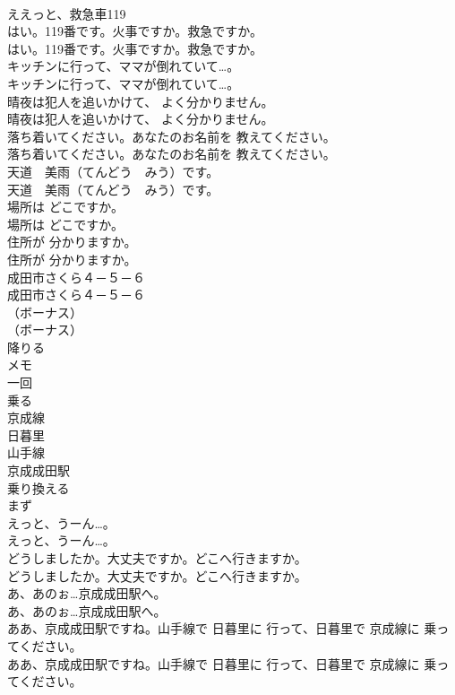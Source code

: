 \documentclass[8pt]{extreport}
\begin{document}
\begin{CJK}{UTF8}{min}
\\	ええっと、救急車119 
\\	はい。119番です。火事ですか。救急ですか。	
\\	はい。119番です。火事ですか。救急ですか。 
\\	キッチンに行って、ママが倒れていて…。	
\\	キッチンに行って、ママが倒れていて…。 
\\	晴夜は犯人を追いかけて、 よく分かりません。	
\\	晴夜は犯人を追いかけて、 よく分かりません。 
\\	落ち着いてください。あなたのお名前を 教えてください。	
\\	落ち着いてください。あなたのお名前を 教えてください。 
\\	天道　美雨（てんどう　みう）です。	
\\	天道　美雨（てんどう　みう）です。 
\\	場所は どこですか。	
\\	場所は どこですか。 
\\	住所が 分かりますか。	
\\	住所が 分かりますか。 
\\	成田市さくら４－５－６	
\\	成田市さくら４－５－６ 
\\	（ボーナス）	
\\	（ボーナス） 
\\	降りる
\\	メモ
\\	一回
\\	乗る
\\	京成線
\\	日暮里
\\	山手線
\\	京成成田駅
\\	乗り換える
\\	まず
\\	えっと、うーん…。	
\\	えっと、うーん…。 
\\	どうしましたか。大丈夫ですか。どこへ行きますか。	
\\	どうしましたか。大丈夫ですか。どこへ行きますか。 
\\	あ、あのぉ…京成成田駅へ。	
\\	あ、あのぉ…京成成田駅へ。 
\\	ああ、京成成田駅ですね。山手線で 日暮里に 行って、日暮里で 京成線に 乗ってください。	
\\	ああ、京成成田駅ですね。山手線で 日暮里に 行って、日暮里で 京成線に 乗ってください。 

\end{CJK}
\end{document}
